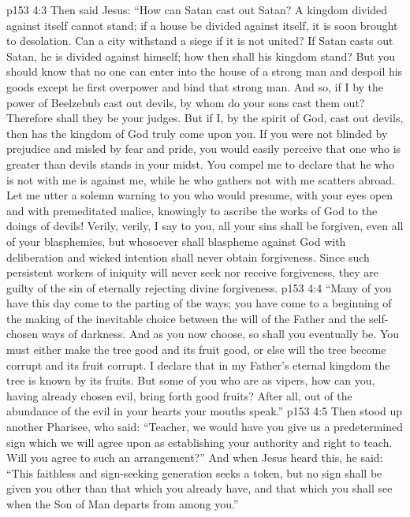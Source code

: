 \vs p153 4:3 Then said Jesus: \textcolor{ubdarkred}{“How can Satan cast out Satan? A kingdom divided against itself cannot stand; if a house be divided against itself, it is soon brought to desolation. Can a city withstand a siege if it is not united? If Satan casts out Satan, he is divided against himself; how then shall his kingdom stand? But you should know that no one can enter into the house of a strong man and despoil his goods except he first overpower and bind that strong man. And so, if I by the power of Beelzebub cast out devils, by whom do your sons cast them out? Therefore shall they be your judges. But if I, by the spirit of God, cast out devils, then has the kingdom of God truly come upon you. If you were not blinded by prejudice and misled by fear and pride, you would easily perceive that one who is greater than devils stands in your midst. You compel me to declare that he who is not with me is against me, while he who gathers not with me scatters abroad. Let me utter a solemn warning to you who would presume, with your eyes open and with premeditated malice, knowingly to ascribe the works of God to the doings of devils! Verily, verily, I say to you, all your sins shall be forgiven, even all of your blasphemies, but whosoever shall blaspheme against God with deliberation and wicked intention shall never obtain forgiveness. Since such persistent workers of iniquity will never seek nor receive forgiveness, they are guilty of the sin of eternally rejecting divine forgiveness.}
\vs p153 4:4 \textcolor{ubdarkred}{“Many of you have this day come to the parting of the ways; you have come to a beginning of the making of the inevitable choice between the will of the Father and the self\hyp{}chosen ways of darkness. And as you now choose, so shall you eventually be. You must either make the tree good and its fruit good, or else will the tree become corrupt and its fruit corrupt. I declare that in my Father’s eternal kingdom the tree is known by its fruits. But some of you who are as vipers, how can you, having already chosen evil, bring forth good fruits? After all, out of the abundance of the evil in your hearts your mouths speak.”}
\vs p153 4:5 Then stood up another Pharisee, who said: “Teacher, we would have you give us a predetermined sign which we will agree upon as establishing your authority and right to teach. Will you agree to such an arrangement?” And when Jesus heard this, he said: \textcolor{ubdarkred}{“This faithless and sign\hyp{}seeking generation seeks a token, but no sign shall be given you other than that which you already have, and that which you shall see when the Son of Man departs from among you.”}
